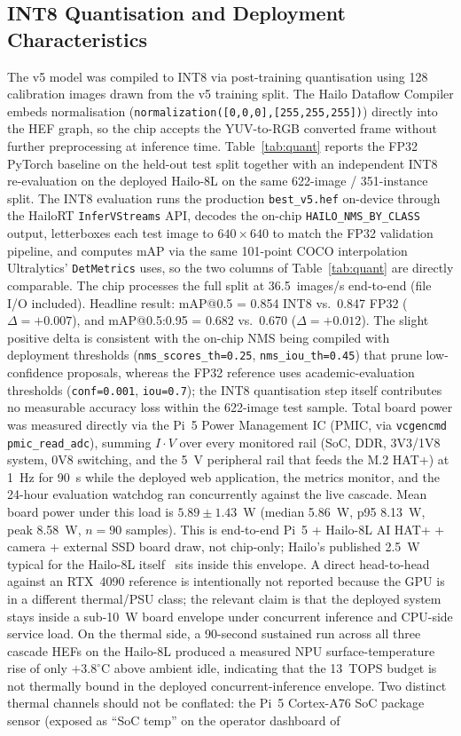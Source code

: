 \documentclass{ieeeaccess}
\begin{document}
\subsection{INT8 Quantisation and Deployment Characteristics}
\label{sec:quant}
The v5 model was compiled to INT8 via post-training quantisation using 128 calibration images drawn from the v5 training split. The Hailo Dataflow Compiler embeds normalisation (\texttt{normalization([0,0,0],[255,255,255])}) directly into the HEF graph, so the chip accepts the YUV-to-RGB converted frame without further preprocessing at inference time. Table~\ref{tab:quant} reports the FP32 PyTorch baseline on the held-out test split together with an independent INT8 re-evaluation on the deployed Hailo-8L on the same 622-image / 351-instance split. The INT8 evaluation runs the production \texttt{best\_v5.hef} on-device through the HailoRT \texttt{InferVStreams} API, decodes the on-chip \texttt{HAILO\_NMS\_BY\_CLASS} output, letterboxes each test image to $640\times640$ to match the FP32 validation pipeline, and computes mAP via the same 101-point COCO interpolation Ultralytics' \texttt{DetMetrics} uses, so the two columns of Table~\ref{tab:quant} are directly comparable. The chip processes the full split at 36.5~images/s end-to-end (file I/O included). Headline result: mAP{@}0.5 = 0.854 INT8 vs.\ 0.847 FP32 ($\Delta = +0.007$), and mAP{@}0.5:0.95 = 0.682 vs.\ 0.670 ($\Delta = +0.012$). The slight positive delta is consistent with the on-chip NMS being compiled with deployment thresholds (\texttt{nms\_scores\_th=0.25}, \texttt{nms\_iou\_th=0.45}) that prune low-confidence proposals, whereas the FP32 reference uses academic-evaluation thresholds (\texttt{conf=0.001}, \texttt{iou=0.7}); the INT8 quantisation step itself contributes no measurable accuracy loss within the 622-image test sample. Total board power was measured directly via the Pi~5 Power Management IC (PMIC, via \texttt{vcgencmd pmic\_read\_adc}), summing $I\!\cdot\!V$ over every monitored rail (SoC, DDR, 3V3/1V8 system, 0V8 switching, and the 5~V peripheral rail that feeds the M.2 HAT+) at 1~Hz for 90~s while the deployed web application, the metrics monitor, and the 24-hour evaluation watchdog ran concurrently against the live cascade. Mean board power under this load is $5.89 \pm 1.43$~W (median 5.86~W, p95 8.13~W, peak 8.58~W, $n=90$ samples). This is end-to-end Pi~5 + Hailo-8L AI HAT+ + camera + external SSD board draw, not chip-only; Hailo's published 2.5~W typical for the Hailo-8L itself~\cite{b3} sits inside this envelope. A direct head-to-head against an RTX~4090 reference is intentionally not reported because the GPU is in a different thermal/PSU class; the relevant claim is that the deployed system stays inside a sub-10~W board envelope under concurrent inference and CPU-side service load. On the thermal side, a 90-second sustained run across all three cascade HEFs on the Hailo-8L produced a measured NPU surface-temperature rise of only $+3.8^\circ$C above ambient idle, indicating that the 13~TOPS budget is not thermally bound in the deployed concurrent-inference envelope. Two distinct thermal channels should not be conflated: the Pi~5 Cortex-A76 SoC package sensor (exposed as ``SoC temp'' on the operator dashboard of 
\end{document}
